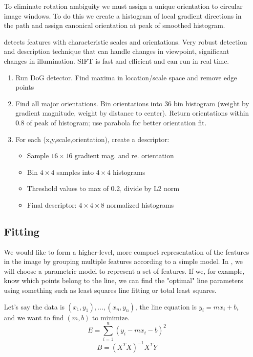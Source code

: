 \documentclass{article}
\begin{document}
To eliminate rotation ambiguity we must assign a unique orientation to circular image windows. To do this we create a histogram of local gradient directions in the path and assign canonical orientation at peak of smoothed histogram. 
\begin{definition}[SIFT]
  detects features with characteristic scales and orientations. Very robust detection and description technique that can handle changes in viewpoint, significant changes in illumination. SIFT is fast and efficient and can run in real time. 
  \begin{enumerate}
    \item Run DoG detector. Find maxima in location/scale space and remove edge points 
    \item Find all major orientations. Bin orientations into 36 bin histogram (weight by gradient magnitude, weight by distance to center). Return orientations within 0.8 of peak of histogram; use parabola for better orientation fit. 
    \item For each (x,y,scale,orientation), create a descriptor: 
      \begin{itemize}
        \item Sample $16 \times 16$ gradient mag. and re. orientation 
        \item Bin $4 \times 4$ samples into $4 \times 4$ histograms 
        \item Threshold values to max of 0.2, divide by L2 norm 
        \item Final descriptor: $4 \times 4 \times 8$ normalized histograms
      \end{itemize}
  \end{enumerate}
\end{definition}

\subsection{Fitting}

We would like to form a higher-level, more compact representation of the features in the image by grouping multiple features according to a simple model. In , we will choose a parametric model to represent a set of features. If we, for example, know which points belong to the line, we can find the "optimal" line parameters using something such as least squares line fitting or total least squares. \\ 

\begin{definition}
  Let's say the data is $(x_1 , y_1), \dots , (x_n , y_n)$, the line equation is $y_i = m x_i + b$, and we want to find $(m,b)$ to minimize. $$E = \sum^{n}_{i=1} (y_i - mx_i - b)^{2}$$ $$B = (X^{T}X)^{-1}X^{T}Y$$
\end{definition}
\end{document}
